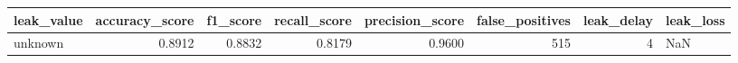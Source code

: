 \begin{tabular}{lrrrrrrl}
\toprule
leak\_value & accuracy\_score & f1\_score & recall\_score & precision\_score & false\_positives & leak\_delay & leak\_loss \\
\midrule
unknown & 0.8912 & 0.8832 & 0.8179 & 0.9600 & 515 & 4 & NaN \\
\bottomrule
\end{tabular}

